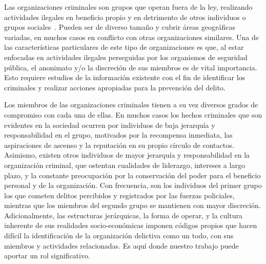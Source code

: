 Las organizaciones criminales son grupos que operan fuera de la ley, realizando actividades ilegales en beneficio propio y en detrimento de otros individuos o grupos sociales~\cite{finckenauer2005problems}. Pueden ser de diverso tamaño y cubrir áreas geográficas variadas, en muchos casos en conflicto con otras organizaciones similares. Una de las características particulares de este tipo de organizaciones es que, al estar enfocadas en actividades ilegales perseguidas por los organismos de seguridad pública, el anonimato y/o la discreción de sus miembros es de vital importancia. Esto requiere estudios de la información existente con el fin de identificar los criminales y realizar acciones apropiadas para la prevención del delito.

Los miembros de las organizaciones criminales tienen a su vez diversos grados de compromiso con cada una de ellas. En muchos casos los hechos criminales que son evidentes en la sociedad ocurren por individuos de baja jerarquía y responsabilidad en el grupo, motivados por la recompensa inmediata, las aspiraciones de ascenso y la reputación en su propio círculo de contactos. Asimismo, existen otros individuos de mayor jerarquía y responsabilidad en la organización criminal, que ostentan cualidades de liderazgo, intereses a largo plazo, y la constante preocupación por la conservación del poder para el beneficio personal y de la organización. Con frecuencia, son los individuos del primer grupo los que cometen delitos percibidos y registrados por las fuerzas policiales, mientras que los miembros del segundo grupo se mantienen con mayor discreción. Adicionalmente, las estructuras jerárquicas, la forma de operar, y la cultura inherente de sus realidades socio-económicas  imponen códigos propios que hacen difícil la identificación de la organización delictiva como un todo, con sus miembros y actividades relacionadas. Es aquí donde nuestro trabajo puede aportar un rol significativo.